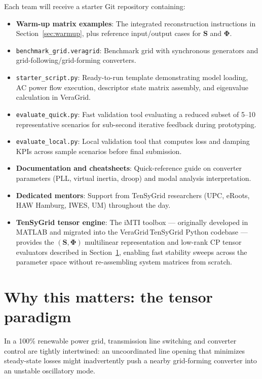 \documentclass[11pt,a4paper]{article}
\begin{document}
Each team will receive a starter Git repository containing:
\begin{itemize}[leftmargin=*, itemsep=1pt, parsep=0pt]
  \item \textbf{Warm-up matrix examples}: The integrated reconstruction instructions in Section~\ref{sec:warmup}, plus reference input/output cases for $\mathbf{S}$ and $\boldsymbol{\Phi}$.
  \item \texttt{benchmark\_grid.veragrid}: Benchmark grid with synchronous generators and grid-following/\allowbreak grid-forming converters.
  \item \texttt{starter\_script.py}: Ready-to-run template demonstrating model loading, AC power flow execution, descriptor state matrix assembly, and eigenvalue calculation in VeraGrid.
  \item \texttt{evaluate\_quick.py}: Fast validation tool evaluating a reduced subset of 5--10 representative scenarios for sub-second iterative feedback during prototyping.
  \item \texttt{evaluate\_local.py}: Local validation tool that computes loss and damping KPIs across sample scenarios before final submission.
  \item \textbf{Documentation and cheatsheets}: Quick-reference guide on converter parameters (PLL, virtual inertia, droop) and modal analysis interpretation.
  \item \textbf{Dedicated mentors}: Support from TenSyGrid researchers (UPC, eRoots, HAW Hamburg, IWES, UM) throughout the day.
  \item \textbf{TenSyGrid tensor engine}: The iMTI toolbox --- originally developed in MATLAB and migrated into the VeraGrid\,TenSyGrid Python codebase --- provides the $(\mathbf{S}, \boldsymbol{\Phi})$ multilinear representation and low-rank CP tensor evaluators described in Section~\ref{sec:tensor}, enabling fast stability sweeps across the parameter space without re-assembling system matrices from scratch.
\end{itemize}

\section{Why this matters: the tensor paradigm}
\label{sec:tensor}

In a 100\% renewable power grid, transmission line switching and converter control are tightly intertwined: an uncoordinated line opening that minimizes steady-state losses might inadvertently push a nearby grid-forming converter into an unstable oscillatory mode.
\end{document}
